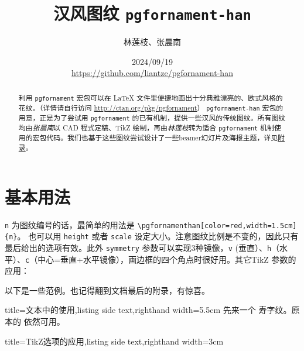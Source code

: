 \documentclass[fontset=fandol]{ctexart}
\title{汉风图纹 \texttt{pgfornament-han}}
\author{林莲枝、张晨南}
\date{2024/09/19\\\url{https://github.com/liantze/pgfornament-han}}
\newcommand{\latexinline}[1]{\lstinline|#1|}
\begin{document}
\maketitle

\begin{abstract}
利用 \texttt{pgfornament} 宏包可以在 \LaTeX{} 文件里便捷地画出十分典雅漂亮的、欧式风格的花纹。（详情请自行访问 \url{http://ctan.org/pkg/pgfornament}）
 \texttt{pgfornament-han} 宏包的用意，正是为了尝试用 \texttt{pgfornament} 的已有机制，提供一些汉风的传统图纹。所有图纹均由\emph{张晨南}以 CAD 程式定稿、TikZ 绘制，再由\emph{林莲枝}转为适合 \texttt{pgfornament} 机制使用的宏包代码。我们也基于这些图纹尝试设计了一些beamer幻灯片及海报主题，详见\hyperref[appendix-start]{附录}。
\end{abstract}

\part{基本用法}

\texttt{n} 为图纹编号的话，最简单的用法是 \latexinline{\pgfornamenthan[color=red,width=1.5cm]{n}}。
也可以用 \texttt{height} 或者 \texttt{scale} 设定大小。注意图纹比例是不变的，因此只有最后给出的选项有效。此外 \texttt{symmetry} 参数可以实现3种镜像，\texttt{v} (垂直）、\texttt{h}（水平）、\texttt{c}（中心=垂直+水平镜像），画边框的四个角点时很好用。其它TikZ 参数的应用：

\begin{latexcode}
\end{latexcode}

以下是一些范例。也记得翻到文档最后的附录，有惊喜。

\bigskip

\begin{tcblisting}{title={文本中的使用},listing side text,righthand width=5.5cm}
先来一个 
寿字纹。原本的  依然可用。
\end{tcblisting}

\enlargethispage{\baselineskip}


\begin{tcblisting}{title={TikZ选项的应用},listing side text,righthand width=3cm}
\end{tcblisting}
\end{document}
